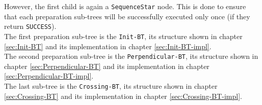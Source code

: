     However, the first child is again a \texttt{SequenceStar} node. This is done to ensure that each preparation sub-trees will be successfully executed only once (if they return \texttt{SUCCESS}).\\
    The first preparation sub-tree is the \texttt{Init-BT}, its structure shown in chapter \ref{sec:Init-BT} and its implementation in chapter \ref{sec:Init-BT-impl}.\\
    The second preparation sub-tree is the \texttt{Perpendicular-BT}, its structure shown in chapter \ref{sec:Perpendicular-BT} and its implementation in chapter \ref{sec:Perpendicular-BT-impl}.\\
    The last sub-tree is the \texttt{Crossing-BT}, its structure shown in chapter \ref{sec:Crossing-BT} and its implementation in chapter \ref{sec:Crossing-BT-impl}.

